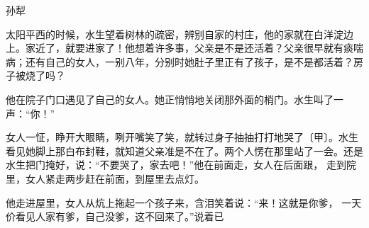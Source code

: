 \documentclass{ctexart}
\renewcommand{\\}{\par}
\begin{document}
\begin{center}孙犁\end{center}\\太阳平西的时候，水生望着树林的疏密，辨别自家的村庄，他的家就在白洋淀边上。家近了，就要进家了！他想着许多事，父亲是不是还活着？父亲很早就有痰喘病；还有自己的女人，一别八年，分别时她肚子里正有了孩子，是不是都活着？房子被烧了吗？\\他在院子门口遇见了自己的女人。她正悄悄地关闭那外面的梢门。水生叫了一声：“你！”\\女人一怔，睁开大眼睛，咧开嘴笑了笑，就转过身子抽抽打打地哭了〔甲〕。水生看见她脚上那白布封鞋，就知道父亲准是不在了。两个人愣在那里站了一会。还是水生把门掩好，说：“不要哭了，家去吧！”他在前面走，女人在后面跟， 走到院里，女人紧走两步赶在前面，到屋里去点灯。\\他走进屋里，女人从炕上拖起一个孩子来，含泪笑着说：“来！这就是你爹， 一天价看见人家有爹，自己没爹，这不回来了。”说着已
\end{document}
